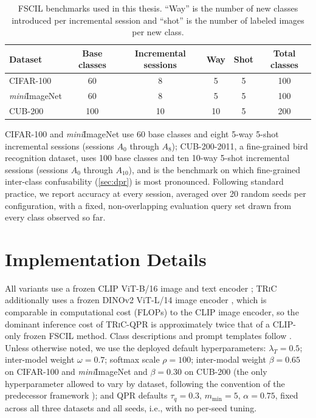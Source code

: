 \documentclass{iutbscthesis}
\begin{document}
\begin{table}[H]
    \centering
    \begin{tabular}{l c c c c c}
        \toprule
        Dataset & Base classes & Incremental sessions & Way & Shot & Total classes \\
        \midrule
        CIFAR-100 \autocite{krizhevsky2009learning} & 60 & 8 & 5 & 5 & 100 \\
        \emph{mini}ImageNet \autocite{vinyals2016matching} & 60 & 8 & 5 & 5 & 100 \\
        CUB-200 \autocite{wah2011caltech} & 100 & 10 & 10 & 5 & 200 \\
        \bottomrule
    \end{tabular}
    \caption{FSCIL benchmarks used in this thesis. ``Way'' is the number of new classes introduced per incremental session and ``shot'' is the number of labeled images per new class.}
    \label{tab:datasets}
\end{table}

CIFAR-100 and \emph{mini}ImageNet use 60 base classes and eight 5-way 5-shot incremental sessions (sessions $A_0$ through $A_8$); CUB-200-2011, a fine-grained bird recognition dataset, uses 100 base classes and ten 10-way 5-shot incremental sessions (sessions $A_0$ through $A_{10}$), and is the benchmark on which fine-grained inter-class confusability (\autoref{sec:dpr}) is most pronounced. Following standard practice, we report accuracy at every session, averaged over 20 random seeds per configuration, with a fixed, non-overlapping evaluation query set drawn from every class observed so far.

\section{Implementation Details}

All variants use a frozen CLIP ViT-B/16 image and text encoder \autocite{radford2021learning}; \textsc{TRiC} additionally uses a frozen DINOv2 ViT-L/14 image encoder \autocite{oquab2023dinov2}, which is comparable in computational cost (FLOPs) to the CLIP image encoder, so the dominant inference cost of \textsc{TRiC}-QPR is approximately twice that of a CLIP-only frozen FSCIL method. Class descriptions and prompt templates follow \textcite{chen2025bimc}. Unless otherwise noted, we use the deployed default hyperparameters: $\lambda_T = 0.5$; inter-model weight $\omega = 0.7$; softmax scale $\rho = 100$; inter-modal weight $\beta = 0.65$ on CIFAR-100 and \emph{mini}ImageNet and $\beta = 0.30$ on CUB-200 (the only hyperparameter allowed to vary by dataset, following the convention of the predecessor framework \autocite{chen2025bimc}); and QPR defaults $\tau_q = 0.3$, $m_{\min} = 5$, $\alpha = 0.75$, fixed across all three datasets and all seeds, i.e., with no per-seed tuning.
\end{document}
